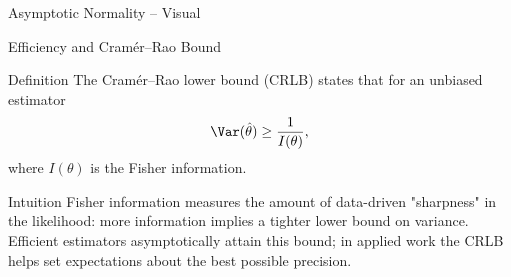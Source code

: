 \begin{frame}{Asymptotic Normality -- Visual}
  \begin{center}
    \begin{adjustbox}{max height=0.40\textheight}
    \end{adjustbox}
  \end{center}
\end{frame}

\begin{frame}{Efficiency and Cramér--Rao Bound}
  \begin{block}{Definition}
    The Cramér--Rao lower bound (CRLB) states that for an unbiased estimator
    \[\Var(\hat{\theta}) \geq \frac{1}{I(\theta)},\]
    where $I(\theta)$ is the Fisher information.
  \end{block}

  \begin{block}{Intuition}
    Fisher information measures the amount of data-driven "sharpness" in the
    likelihood: more information implies a tighter lower bound on variance.
    Efficient estimators asymptotically attain this bound; in applied work the
    CRLB helps set expectations about the best possible precision.
  \end{block}

  \vspace{1em}
  \begin{center}
  \end{center}
\end{frame}

